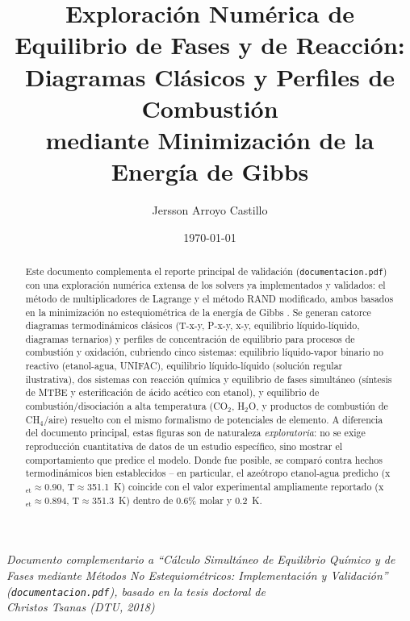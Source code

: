 \documentclass[11pt,a4paper]{article}
\title{\textbf{Exploración Numérica de Equilibrio de Fases y de Reacción:\\
Diagramas Clásicos y Perfiles de Combustión\\
mediante Minimización de la Energía de Gibbs}}
\author{Jersson Arroyo Castillo}
\date{\today}
\begin{document}
\maketitle

\begin{center}
\textit{Documento complementario a ``Cálculo Simultáneo de Equilibrio Químico y de\\
Fases mediante Métodos No Estequiométricos: Implementación y Validación''\\
(\texttt{documentacion.pdf}), basado en la tesis doctoral de\\
Christos Tsanas (DTU, 2018)}
\end{center}

\vspace{0.5cm}

\begin{abstract}
Este documento complementa el reporte principal de validación
(\texttt{documentacion.pdf}) con una exploración numérica extensa de
los solvers ya implementados y validados: el método de multiplicadores
de Lagrange y el método RAND modificado, ambos basados en la
minimización no estequiométrica de la energía de Gibbs
\citep{tsanas2018}. Se generan catorce diagramas termodinámicos
clásicos (T-x-y, P-x-y, x-y, equilibrio líquido-líquido, diagramas
ternarios) y perfiles de concentración de equilibrio para procesos de
combustión y oxidación, cubriendo cinco sistemas: equilibrio
líquido-vapor binario no reactivo (etanol-agua, UNIFAC), equilibrio
líquido-líquido (solución regular ilustrativa), dos sistemas con
reacción química y equilibrio de fases simultáneo (síntesis de MTBE y
esterificación de ácido acético con etanol), y equilibrio de
combustión/disociación a alta temperatura (CO$_2$, H$_2$O, y productos
de combustión de CH$_4$/aire) resuelto con el mismo formalismo de
potenciales de elemento. A diferencia del documento principal, estas
figuras son de naturaleza \emph{exploratoria}: no se exige
reproducción cuantitativa de datos de un estudio específico, sino
mostrar el comportamiento que predice el modelo. Donde fue posible, se
comparó contra hechos termodinámicos bien establecidos -- en
particular, el azeótropo etanol-agua predicho (x$_{\text{et}}\approx$0.90,
T$\approx$351.1~K) coincide con el valor experimental ampliamente
reportado (x$_{\text{et}}\approx$0.894, T$\approx$351.3~K) dentro de
0.6\% molar y 0.2~K.
\end{abstract}

\tableofcontents

\end{document}
